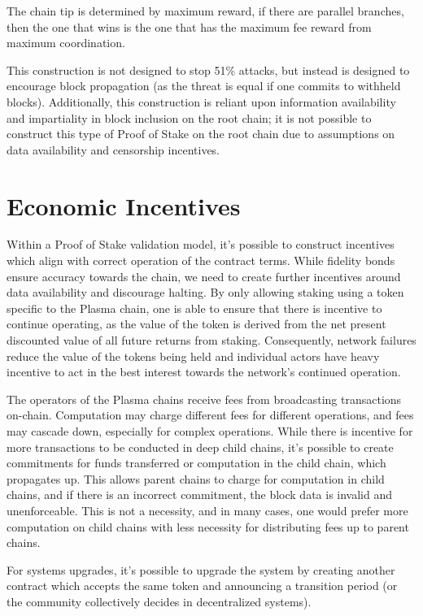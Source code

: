 \documentclass[letterpaper, 11pt]{article}
\begin{document}
The chain tip is determined by maximum reward, if there are parallel branches,
then the one that wins is the one that has the maximum fee reward from maximum
coordination.

This construction is not designed to stop 51\% attacks, but instead is designed
to encourage block propagation (as the threat is equal if one commits to
withheld blocks). Additionally, this construction is reliant upon information
availability and impartiality in block inclusion on the root chain; it is not
possible to construct this type of Proof of Stake on the root chain due to
assumptions on data availability and censorship incentives.

\section{Economic Incentives}

Within a Proof of Stake validation model, it's possible to construct incentives
which align with correct operation of the contract terms. While fidelity bonds
ensure accuracy towards the chain, we need to create further incentives around
data availability and discourage halting. By only allowing staking using a
token specific to the Plasma chain, one is able to ensure that there is
incentive to continue operating, as the value of the token is derived from the
net present discounted value of all future returns from staking. Consequently,
network failures reduce the value of the tokens being held and individual
actors have heavy incentive to act in the best interest towards the network's
continued operation.

The operators of the Plasma chains receive fees from broadcasting transactions
on-chain. Computation may charge different fees for different operations, and
fees may cascade down, especially for complex operations. While there is
incentive for more transactions to be conducted in deep child chains, it's
possible to create commitments for funds transferred or computation in the child
chain, which propagates up. This allows parent chains to charge for computation
in child chains, and if there is an incorrect commitment, the block data is
invalid and unenforceable. This is not a necessity, and in many cases, one would
prefer more computation on child chains with less necessity for distributing
fees up to parent chains.

For systems upgrades, it's possible to upgrade the system by creating another
contract which accepts the same token and announcing a transition period (or the
community collectively decides in decentralized systems).
\end{document}
